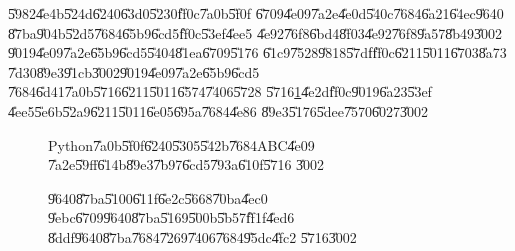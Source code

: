 \documentclass[12pt,a4paper]{article}
\begin{document}
\bigskip

\U{5982}\U{4e4b}\U{524d}\U{6240}\U{63d0}\U{5230}\U{ff0c}\U{7a0b}\U{5f0f}%
\U{6709}\U{4e09}\U{7a2e}\U{4e0d}\U{540c}\U{7684}\U{6a21}\U{64ec}\U{9640}%
\U{87ba}\U{904b}\U{52d5}\U{7684}\U{65b9}\U{6cd5}\U{ff0c}\U{53ef}\U{4ee5}%
\U{4e92}\U{76f8}\U{6bd4}\U{8f03}\U{4e92}\U{76f8}\U{9a57}\U{8b49}\U{3002}%
\U{9019}\U{4e09}\U{7a2e}\U{65b9}\U{6cd5}\U{5404}\U{81ea}\U{6709}\U{5176}%
\U{61c9}\U{7528}\U{9818}\U{57df}\U{ff0c}\U{6211}\U{5011}\U{6703}\U{8a73}%
\U{7d30}\U{89e3}\U{91cb}\U{3002}\U{9019}\U{4e09}\U{7a2e}\U{65b9}\U{6cd5}%
\U{7684}\U{6d41}\U{7a0b}\U{5716}\U{6211}\U{5011}\U{6574}\U{7406}\U{5728}%
\U{5716}\ref{ABCmethodsIllustration}\U{4e2d}\U{ff0c}\U{9019}\U{6a23}\U{53ef}%
\U{4ee5}\U{5e6b}\U{52a9}\U{6211}\U{5011}\U{6e05}\U{695a}\U{7684}\U{4e86}%
\U{89e3}\U{5176}\U{5dee}\U{7570}\U{6027}\U{3002}

\begin{figure}[th]
\caption{Python\U{7a0b}\U{5f0f}\U{6240}\U{5305}\U{542b}\U{7684}ABC\U{4e09}%
\U{7a2e}\U{59ff}\U{614b}\U{89e3}\U{7b97}\U{6cd5}\U{793a}\U{610f}\U{5716}%
\U{3002}}
\label{ABCmethodsIllustration}
\begin{center}

\end{center}
\end{figure}

\begin{figure}[th]
\caption{\U{9640}\U{87ba}\U{5100}\U{611f}\U{6e2c}\U{5668}\U{70ba}\U{4ec0}%
\U{9ebc}\U{6709}\U{9640}\U{87ba}\U{5169}\U{500b}\U{5b57}\U{ff1f}\U{4ed6}%
\U{8ddf}\U{9640}\U{87ba}\U{7684}\U{7269}\U{7406}\U{7684}\U{95dc}\U{4fc2}%
\U{5716}\U{3002}}
\label{gyro_relation_graph}
\begin{center}
\end{center}
\end{figure}
\end{document}
